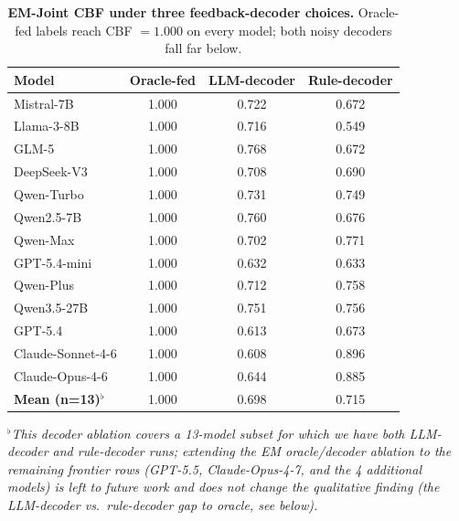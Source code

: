 \documentclass[11pt]{article}
\begin{document}
\begin{table}[h]
\centering
\small
\caption{\textbf{EM-Joint CBF under three feedback-decoder choices.} Oracle-fed labels reach CBF $= 1.000$ on every model; both noisy decoders fall far below.}
\label{tab:decoder_ablation}
\begin{tabular}{l ccc}
\toprule
\textbf{Model} & \textbf{Oracle-fed} & \textbf{LLM-decoder} & \textbf{Rule-decoder} \\
\midrule
Mistral-7B          & 1.000 & 0.722 & 0.672 \\
Llama-3-8B          & 1.000 & 0.716 & 0.549 \\
GLM-5               & 1.000 & 0.768 & 0.672 \\
DeepSeek-V3       & 1.000 & 0.708 & 0.690 \\
Qwen-Turbo          & 1.000 & 0.731 & 0.749 \\
Qwen2.5-7B          & 1.000 & 0.760 & 0.676 \\
Qwen-Max            & 1.000 & 0.702 & 0.771 \\
GPT-5.4-mini        & 1.000 & 0.632 & 0.633 \\
Qwen-Plus           & 1.000 & 0.712 & 0.758 \\
Qwen3.5-27B         & 1.000 & 0.751 & 0.756 \\
GPT-5.4             & 1.000 & 0.613 & 0.673 \\
Claude-Sonnet-4-6   & 1.000 & 0.608 & 0.896 \\
Claude-Opus-4-6     & 1.000 & 0.644 & 0.885 \\
\midrule
\textbf{Mean (n=13)$^\flat$} & 1.000 & 0.698 & 0.715 \\
\bottomrule
\end{tabular}
\end{table}

$^\flat$\emph{This decoder ablation covers a 13-model subset for which we have both LLM-decoder and rule-decoder runs; extending the EM oracle/decoder ablation to the remaining frontier rows (GPT-5.5, Claude-Opus-4-7, and the 4 additional models) is left to future work and does not change the qualitative finding (the LLM-decoder vs.\ rule-decoder gap to oracle, see below).}
\end{document}
